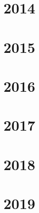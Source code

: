   \section{2014}  
  \section{2015}
  \section{2016}
  \section{2017}
  \section{2018}
  \section{2019}
